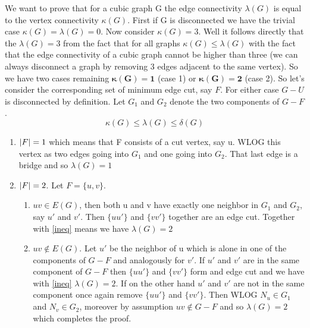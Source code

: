 \documentclass{article}
\DeclarePairedDelimiter{\abs}{\lvert}{\rvert}
\begin{document}
	We want to prove that for a cubic graph G the edge connectivity $\lambda(G)$ is equal to the vertex connectivity $\kappa(G)$. First if G is disconnected we have the trivial case $\kappa(G) = \lambda(G) = 0$. Now consider $\kappa(G)= 3$. Well it follows directly that the $\lambda(G) = 3$ from the fact that for all graphs $\kappa(G) \leq \lambda(G)$ with the fact that the edge connectivity of a cubic graph cannot be higher than three (we can always disconnect a graph by removing 3 edges adjacent to the same vertex). So we have two cases remaining $\bm {\kappa(G) = 1}$ (case 1) or $\bm{\kappa(G)= 2}$ (case 2). So let's consider the corresponding set of minimum edge cut, say $F$. For either case $G-U$ is disconnected by definition. Let $G_1$ and $G_2$ denote the two components of $G-F$.
	\begin{equation}\label{ineq}
		\kappa(G) \leq \lambda(G) \leq \delta(G)
	\end{equation}
	\begin{enumerate}
		\item $\abs F = 1$ which means that F consists of a cut vertex, say u. WLOG this vertex as two edges going into $G_1$ and one going into $G_2$. That last edge is a bridge and so $\lambda(G) = 1$
		\item  $\abs F = 2$. Let $F = \{u,v\}$. 
		\begin{enumerate}
			\item $uv \in E(G)$, then both u and v have exactly one neighbor in $G_1$ and $G_2$, say $u'$ and $v'$. Then $\{uu'\} $ and $\{vv'\}$ together are an edge cut. Together with \ref{ineq} means we have $\lambda(G) = 2$
			\item $uv \notin E(G)$.  Let $u'$ be the neighbor of u which is alone in one of the components of $G-F$ and analogously for $v'$. If $u'$ and $v'$ are in the same component of $G-F$ then $\{uu'\}$ and $\{vv'\}$ form and edge cut and we have with \ref{ineq} $\lambda(G) = 2$. If on the other hand $u'$ and $v'$ are not in the same component once again remove $\{uu'\}$ and $\{vv'\}$. Then WLOG $N_u \in G_1$ and $N_v \in G_2$, moreover by assumption $uv \notin G-F$ and so $\lambda(G) = 2$ which completes the proof. 
		\end{enumerate}
	\end{enumerate}
	
	
	
	\clearpage
	
		
	
	
	
	
	
	

	
	
	
	
	
\end{document}
